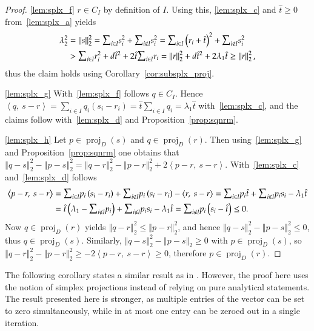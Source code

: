 \documentclass[twoside,11pt]{article}
\DeclareMathOperator{\proj}{proj}
\newcommand{\0}{\mathcal{O}}
\newcommand{\norm}[1]{\left\Vert#1\right\Vert}
\newcommand{\scp}[2]{\left<#1,\ #2\right>}
\newcommand{\smallsum}{\scalebox{1.2}{$\sum$}}
\begin{document}
\begin{proof}
\ref{lem:splx_f}
$r\in C_I$ by definition of $I$.
Using this, \ref{lem:splx_c} and $\hat{t}\geq 0$ from~\ref{lem:splx_a} yields
\begin{align*}
  \lambda_2^2
  &= \norm{s}_2^2
   = \smallsum_{i\in I}s_i^2 + \smallsum_{i\not\in I}s_i^2
   = \smallsum_{i\in I}\left(r_i + \hat{t}\right)^2 + \smallsum_{i\not\in I}s_i^2\\
  &> \smallsum_{i\in I}r_i^2 + d\hat{t}^2 + 2\hat{t}\smallsum_{i\in I}r_i
  = \norm{r}_2^2 + d\hat{t}^2 + 2\lambda_1\hat{t}
  \geq \norm{r}_2^2\text{,}
\end{align*}
thus the claim holds using Corollary~\ref{cor:subsplx_proj}.

\ref{lem:splx_g}
With~\ref{lem:splx_f} follows $q\in C_I$.
Hence $\scp{q}{s - r} = \sum_{i\in I}q_i\left(s_i - r_i\right) = \hat{t}\sum_{i\in I}q_i = \lambda_1\hat{t}$ with~\ref{lem:splx_c}, and the claims follow with~\ref{lem:splx_d} and Proposition~\ref{prop:sqnrm}.

\ref{lem:splx_h}
Let $p\in\proj_D(s)$ and $q\in\proj_D(r)$.
Then using~\ref{lem:splx_g} and Proposition~\ref{prop:sqnrm} one obtains that $\norm{q - s}_2^2 - \norm{p - s}_2^2 = \norm{q - r}_2^2 - \norm{p - r}_2^2 + 2\scp{p - r}{s - r}$.
With~\ref{lem:splx_c} and~\ref{lem:splx_d} follows
\begin{align*}
  \scp{p - r}{s - r} 
  &= \smallsum_{i\in I}p_i\left(s_i - r_i\right) + \smallsum_{i\not\in I}p_i\left(s_i - r_i\right) - \scp{r}{s - r}
  = \smallsum_{i\in I}p_i\hat{t} + \smallsum_{i\not\in I}p_is_i - \lambda_1\hat{t}\\
  &= \hat{t}\left(\lambda_1 - \smallsum_{i\not\in I}p_i\right) + \smallsum_{i\not\in I}p_is_i - \lambda_1\hat{t}
  = \smallsum_{i\not\in I}p_i\left(s_i - \hat{t}\right) \leq 0\text{.}
\end{align*}
Now $q\in\proj_D(r)$ yields $\norm{q - r}_2^2 \leq \norm{p - r}_2^2$, and hence $\norm{q - s}_2^2 - \norm{p - s}_2^2 \leq 0$, thus $q\in\proj_D(s)$.
Similarly, $\norm{q - s}_2^2 - \norm{p - s}_2\geq 0$ with $p\in\proj_D(s)$, so $\norm{q - r}_2^2 - \norm{p - r}_2^2 \geq -2\scp{p - r}{s - r}\geq 0$, therefore $p\in\proj_D(r)$.
\end{proof}
The following corollary states a similar result as in \cite{Theis2005}.
However, the proof here uses the notion of simplex projections instead of relying on pure analytical statements.
The result presented here is stronger, as multiple entries of the vector can be set to zero simultaneously, while in \cite{Theis2005} at most one entry can be zeroed out in a single iteration.
\end{document}
